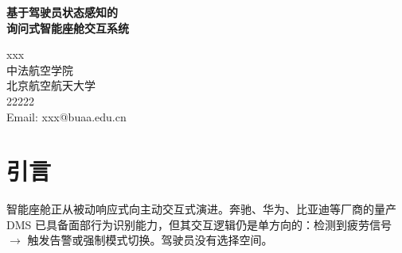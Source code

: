 \documentclass[12pt,a4paper]{ctexart}
\begin{document}
\begin{center}
    {\LARGE\bfseries\heiti 基于驾驶员状态感知的\\[6pt]询问式智能座舱交互系统}

    \vspace{18pt}

    {\large
    xxx\\[6pt]
    中法航空学院 \\
    北京航空航天大学 \\
    22222\\[6pt]
    Email: xxx@buaa.edu.cn
    }

\end{center}

\vspace{-6pt}

\begin{abstract}
\noindent
当前驾驶员监控系统（DMS）普遍将哈欠视为疲劳告警信号，采取强制干预策略，剥夺了用户的决策权。
本文提出一种\textbf{询问式交互}范式：系统将哈欠视作低唤醒度放松状态的线索（cue），以语音主动向驾驶员发起询问，由驾驶员确认后执行座舱模式切换。
系统基于 MediaPipe 面部 landmark 计算 MAR（Mouth Aspect Ratio），采用指数衰减评分模型检测哈欠；
通过 Whisper 本地语音识别与双层 NLP（关键词匹配 + DeepSeek API fallback）解析驾驶员意图；
由 FSM 驱动八状态交互流程，在 Pygame 桌面环境中模拟 Dynamic Mode / Rest Mode 双模式座舱切换。
本文重点分析该系统的\textbf{Shared Control}与\textbf{Human-in-the-Loop}设计原则，讨论询问式交互对\textbf{User Agency}的保护机制。
系统在 PC 平台上完整实现了 perception--inquiry--confirmation--execution 闭环，为智能座舱中非侵入式主动交互提供了可运行的参考原型。

\vspace{6pt}
\noindent\textbf{关键词：}智能座舱；询问式交互；用户主体性；共享控制；人在回路；驾驶员状态感知
\end{abstract}

\section{引言}

智能座舱正从被动响应式向主动交互式演进。奔驰、华为、比亚迪等厂商的量产 DMS 已具备面部行为识别能力，但其交互逻辑仍是单方向的：检测到疲劳信号 $\rightarrow$ 触发告警或强制模式切换。驾驶员没有选择空间。
\end{document}
